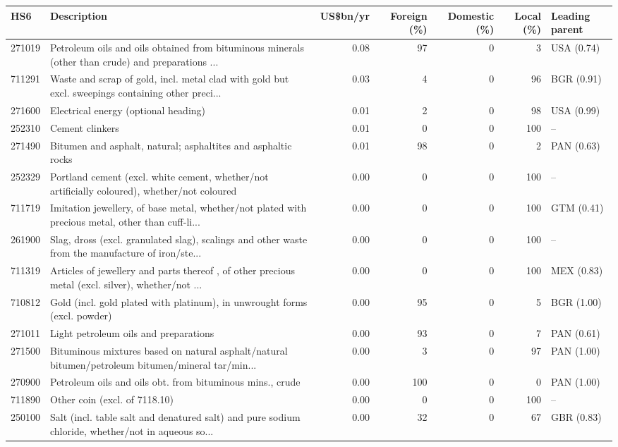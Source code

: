 \begin{tabular}{@{}l p{6.4cm} r r r r l@{}}
\toprule
HS6 & Description & US\$bn/yr & Foreign (\%) & Domestic (\%) & Local (\%) & Leading parent \\
\midrule
271019 & Petroleum oils and oils obtained from bituminous minerals (other than crude) and preparations ... & 0.08 & 97 & 0 & 3 & USA (0.74) \\
711291 & Waste and scrap of gold, incl. metal clad with gold but excl. sweepings containing other preci... & 0.03 & 4 & 0 & 96 & BGR (0.91) \\
271600 & Electrical energy (optional heading) & 0.01 & 2 & 0 & 98 & USA (0.99) \\
252310 & Cement clinkers & 0.01 & 0 & 0 & 100 & -- \\
271490 & Bitumen and asphalt, natural; asphaltites and asphaltic rocks & 0.01 & 98 & 0 & 2 & PAN (0.63) \\
252329 & Portland cement (excl. white cement, whether/\allowbreak{}not artificially coloured), whether/\allowbreak{}not coloured & 0.00 & 0 & 0 & 100 & -- \\
711719 & Imitation jewellery, of base metal, whether/\allowbreak{}not plated with precious metal, other than cuff-li... & 0.00 & 0 & 0 & 100 & GTM (0.41) \\
261900 & Slag, dross (excl. granulated slag), scalings and other waste from the manufacture of iron/\allowbreak{}ste... & 0.00 & 0 & 0 & 100 & -- \\
711319 & Articles of jewellery and parts thereof , of other precious metal (excl. silver), whether/\allowbreak{}not ... & 0.00 & 0 & 0 & 100 & MEX (0.83) \\
710812 & Gold (incl. gold plated with platinum), in unwrought forms (excl. powder) & 0.00 & 95 & 0 & 5 & BGR (1.00) \\
271011 & Light petroleum oils and preparations & 0.00 & 93 & 0 & 7 & PAN (0.61) \\
271500 & Bituminous mixtures based on natural asphalt/\allowbreak{}natural bitumen/\allowbreak{}petroleum bitumen/\allowbreak{}mineral tar/\allowbreak{}min... & 0.00 & 3 & 0 & 97 & PAN (1.00) \\
270900 & Petroleum oils and oils obt. from bituminous mins., crude & 0.00 & 100 & 0 & 0 & PAN (1.00) \\
711890 & Other coin (excl. of 7118.10) & 0.00 & 0 & 0 & 100 & -- \\
250100 & Salt (incl. table salt and denatured salt) and pure sodium chloride, whether/\allowbreak{}not in aqueous so... & 0.00 & 32 & 0 & 67 & GBR (0.83) \\
\bottomrule
\end{tabular}
